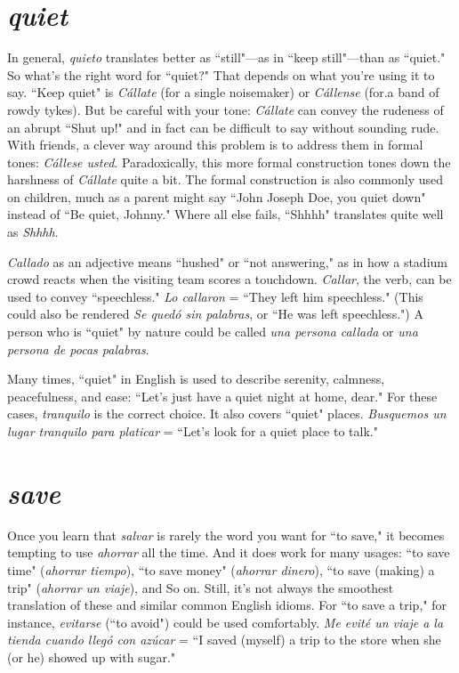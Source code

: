 \section{\emph{quiet}}

In general, \emph{quieto} translates better as ``still"---as in ``keep
still"---than as ``quiet." So what's the right word for ``quiet?" That
depends on what you're using it to say. ``Keep quiet" is \emph{Cállate} (for
a single noisemaker) or \emph{Cállense} (for.a band of rowdy tykes). But be
careful with your tone: \emph{Cállate} can convey the rudeness of an abrupt
``Shut up!" and in fact can be difficult to say without sounding rude.
With friends, a clever way around this problem is to address them in
formal tones: \emph{Cállese usted}. Paradoxically, this more formal construction tones down the harshness of \emph{Cállate} quite a bit. The formal construction is also commonly used on children, much as a parent might
say ``John Joseph Doe, you quiet down" instead of ``Be quiet, Johnny."
Where all else fails, ``Shhhh" translates quite well as \emph{Shhhh}.

\emph{Callado} as an adjective means ``hushed" or ``not answering,"
as in how a stadium crowd reacts when the visiting team scores a
touchdown. \emph{Callar}, the verb, can be used to convey ``speechless." \emph{Lo
	callaron} = ``They left him speechless." (This could also be rendered
\emph{Se quedó sin palabras}, or ``He was left speechless.") A person who is
``quiet" by nature could be called \emph{una persona callada} or \emph{una persona de pocas palabras}.

Many times, ``quiet" in English is used to describe serenity,
calmness, peacefulness, and ease: ``Let's just have a quiet night at
home, dear." For these cases, \emph{tranquilo} is the correct choice. It also
covers ``quiet" places. \emph{Busquemos un lugar tranquilo para platicar} =
``Let's look for a quiet place to talk."

\section{\emph{save}}

Once you learn that \emph{salvar} is rarely the word you want for ``to
save," it becomes tempting to use \emph{ahorrar} all the time. And it does
work for many usages: ``to save time" (\emph{ahorrar tiempo}), ``to save
money" (\emph{ahorrar dinero}), ``to save (making) a trip" (\emph{ahorrar un viaje}),
and So on. Still, it's not always the smoothest translation of these and
similar common English idioms. For ``to save a trip," for instance, \emph{evitarse} (``to avoid") could be used comfortably. \emph{Me evité un viaje a la
	tienda cuando llegó con azúcar} = ``I saved (myself) a trip to the store
when she (or he) showed up with sugar."


